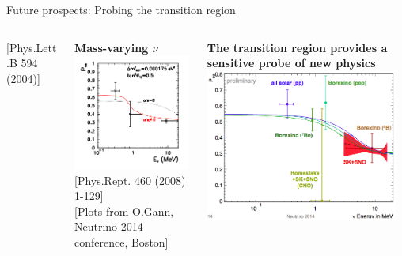 \begin{frame}[t]{Future prospects: Probing the transition region}
\begin{columns}
\begin{column}{0.22\textwidth}
     {\tiny{\color{blue}[Phys.Lett.B 594 (2004)]}}
  \end{column}
  \begin{column}{0.22\textwidth}
     \centering
     {\bf Mass-varying $\nu$}\\
     \includegraphics[width=0.98\textwidth,height=0.32\textheight]{./images/3nu/solar/solar_nonstd_mvarying.png}\\
     {\tiny{\color{blue}[Phys.Rept. 460 (2008) 1-129]}}\\
     \vspace{0.8cm}
     {\scriptsize \color{blue}[Plots from O.Gann, Neutrino 2014 conference, Boston]}
  \end{column}
  \begin{column}{0.56\textwidth}
     \centering
      {\bf The transition region provides a sensitive probe of new physics}\\
      \vspace{0.2cm}
     \includegraphics[width=0.95\textwidth]{./images/3nu/solar/Pee_with_data.png}\\

\end{column}
\end{columns}
\end{frame}
